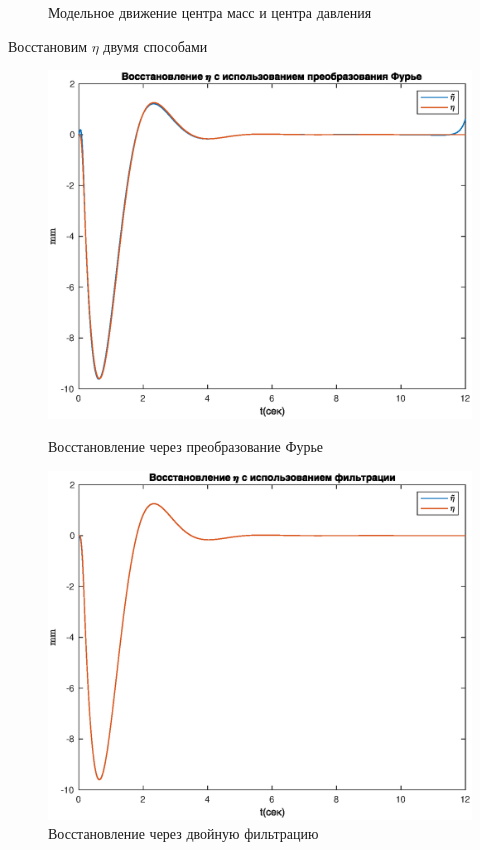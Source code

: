 \documentclass[a4paper,12pt, openany]{book}
\theoremstyle{plain} %
\theoremstyle{definition} %
\theoremstyle{remark} %
\numberwithin{equation}{chapter}
\begin{document}
{\begin{figure}[h!]
\begin{center}
\begin{minipage}[h]{0.48\linewidth}
            \caption{Модельное движение центра масс и центра давления}
        \end{minipage}
    \end{center}
\end{figure}

Восстановим $\eta$ двумя способами
\begin{figure}[h!]
    \begin{center}
        \begin{minipage}[h]{0.48\linewidth}
            \includegraphics[width=1\linewidth]{eta_restore_fur_model.eps}
            \caption{Восстановление через преобразование Фурье}
        \end{minipage}
        \hfill
        \begin{minipage}[h]{0.48\linewidth}
            \includegraphics[width=1\linewidth]{double_filter_model.eps}
            \caption{Восстановление через двойную фильтрацию}
        \end{minipage}
    \end{center}
\end{figure}

}
\end{document}
